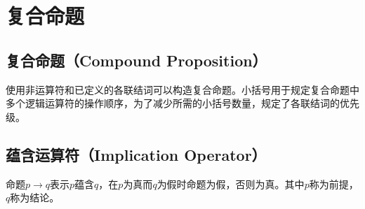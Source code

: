 \documentclass[12pt, openany, oneside]{book}
\begin{document}
\section{复合命题}

\subsection{复合命题（Compound Proposition）}

使用非运算符和已定义的各联结词可以构造复合命题。小括号用于规定复合命题中多个逻辑运算符的操作顺序，为了减少所需的小括号数量，规定了各联结词的优先级。

\begin{table}[H]
	\centering
	\caption{运算符优先级}
\end{table}

\subsection{蕴含运算符（Implication Operator）}

命题$ p \rightarrow q $表示$ p $蕴含$ q $，在$ p $为真而$ q $为假时命题为假，否则为真。其中$ p $称为前提，$ q $称为结论。

\begin{table}[H]
	\centering
	\caption{蕴含真值表}
\end{table}
\end{document}
